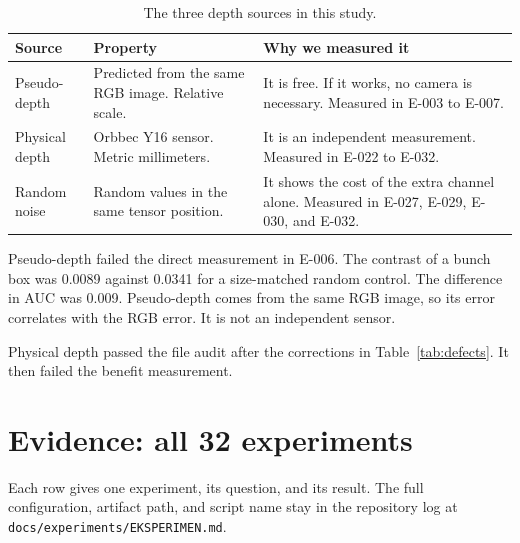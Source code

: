 \documentclass[preprint,12pt]{elsarticle}
\newcommand{\E}[1]{E-#1}
\begin{document}
\begin{table}[H]
\centering
\caption{The three depth sources in this study.}
\label{tab:depthkinds}
\begin{tabularx}{\columnwidth}{L{0.22\columnwidth}L{0.24\columnwidth}Y}
\toprule
\textbf{Source} & \textbf{Property} & \textbf{Why we measured it}\\
\midrule
Pseudo-depth & Predicted from the same RGB image. Relative scale. & It is free.
If it works, no camera is necessary. Measured in \E{003} to \E{007}.\\
Physical depth & Orbbec Y16 sensor. Metric millimeters. & It is an independent
measurement. Measured in \E{022} to \E{032}.\\
Random noise & Random values in the same tensor position. & It shows the cost
of the extra channel alone. Measured in \E{027}, \E{029}, \E{030}, and
\E{032}.\\
\bottomrule
\end{tabularx}
\end{table}

Pseudo-depth failed the direct measurement in \E{006}. The contrast of a bunch
box was 0.0089 against 0.0341 for a size-matched random control. The difference
in AUC was 0.009. Pseudo-depth comes from the same RGB image, so its error
correlates with the RGB error. It is not an independent sensor.

Physical depth passed the file audit after the corrections in
Table~\ref{tab:defects}. It then failed the benefit measurement.

\section{Evidence: all 32 experiments}
\label{sec:experiments}

Each row gives one experiment, its question, and its result. The full
configuration, artifact path, and script name stay in the repository log at
\texttt{docs/experiments/EKSPERIMEN.md}.
\end{document}
